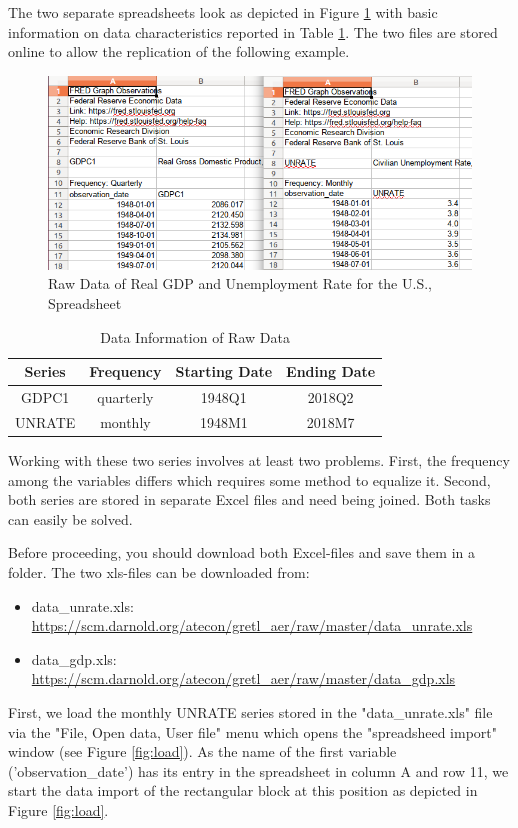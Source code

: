 \documentclass[11pt]{article}
\begin{document}
The two separate spreadsheets look as depicted in Figure \ref{fig:spread} with basic information on data characteristics reported in Table \ref{tab:datainfo}. The two files are stored online to allow the replication of the following example.

\begin{figure}[!h]
	\centering
	\includegraphics[width=.6\textwidth]{../figures/data_spreadsheet}
	\caption{Raw Data of Real GDP and Unemployment Rate for the U.S., Spreadsheet}
	\label{fig:spread}
\end{figure}


\begin{table}[!h]
	\centering
	\footnotesize
	\begin{tabular}{cccc}
		\hline
		Series & Frequency & Starting Date & Ending Date \\ 
		\hline 
		GDPC1	& quarterly & 1948Q1 & 2018Q2 \\ 
		UNRATE	& monthly & 1948M1 & 2018M7 \\ 
		\hline 
	\end{tabular}
	\caption{Data Information of Raw Data}
	\label{tab:datainfo}
\end{table}

Working with these two series involves at least two problems. First, the frequency among the variables differs which requires some method to equalize it. %
Second, both series are stored in separate Excel files and need being joined. Both tasks can easily be solved.

Before proceeding, you should download both Excel-files and save them in a folder. The two xls-files can be downloaded from:
\begin{itemize}
	\item data\_unrate.xls: \url{https://scm.darnold.org/atecon/gretl_aer/raw/master/data_unrate.xls}
	\item data\_gdp.xls: \url{https://scm.darnold.org/atecon/gretl_aer/raw/master/data_gdp.xls}
\end{itemize}

First, we load the monthly UNRATE series stored in the "data\_unrate.xls" file via the "File, Open data, User file" menu which opens the "spreadsheed import" window (see Figure \ref{fig:load}). As the name of the first variable ('observation\_date') has its entry in the spreadsheet in column A and row 11, we start the data import of the rectangular block at this position as depicted in Figure \ref{fig:load}.
\end{document}
